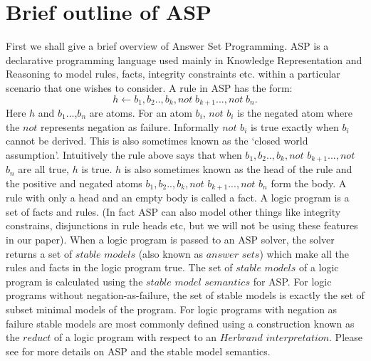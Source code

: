 \section{Brief outline of ASP}
First we shall give a brief overview of Answer Set Programming. ASP is a declarative programming language used mainly in Knowledge Representation and Reasoning to model rules, facts, integrity constraints etc. within a particular scenario that one wishes to consider. A rule in ASP has the form:
\[h\leftarrow b_{1},b_{2}..,b_{k},not\; b_{k+1}...,not\; b_{n}.\]
Here $h$ and $b_{1}$...,$b_{n}$ are atoms. For an atom $b_{i}$, $not$ $b_{i}$ is the negated atom where the $not$ represents negation as failure. Informally $not$ $b_{i}$ is true exactly when $b_{i}$ cannot be derived. This is also sometimes known as the `closed world assumption'. Intuitively the rule above says that when $b_{1},b_{2}..,b_{k},not$ $b_{k+1}...,not$ $b_{n}$ are all true, $h$ is true. $h$ is also sometimes known as the head of the rule and the positive and negated atoms $b_{1},b_{2}..,b_{k},not$ $b_{k+1}...,not$ $b_{n}$ form the body. A rule with only a head and an empty body is called a fact. A logic program is a set of facts and rules. (In fact ASP can also model other things like integrity constrains, disjunctions in rule heads etc, but we will not be using these features in our paper). When a logic program is passed to an ASP solver, the solver returns a set of $stable$ $models$ (also known as $answer$ $sets$) which make all the rules and facts in the logic program true. The set of $stable$ $models$ of a logic program is calculated using the $stable$ $model$ $semantics$ for ASP. For logic programs without negation-as-failure, the set of stable models is exactly the set of subset minimal models of the program. For logic programs with negation as failure stable models are most commonly defined using a construction known as the $reduct$ of a logic program with respect to an $Herbrand$ $interpretation$. Please see \cite{asp_background} for more details on ASP and the stable model semantics.


